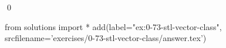 
\begin{ex}
  \label{ex:0-73-stl-vector-class}
  
  \qed
\end{ex}
\begin{python0}
from solutions import *
add(label="ex:0-73-stl-vector-class",
    srcfilename='exercises/0-73-stl-vector-class/answer.tex')
\end{python0}
